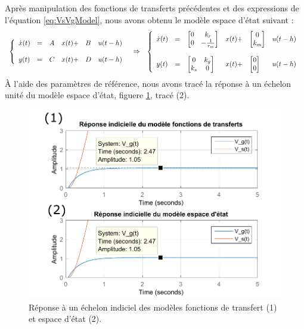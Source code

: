 Après manipulation des fonctions de transferts précédentes et des expressions de l'équation \ref{eq:VsVgModel}, nous avons obtenu le modèle espace d'état suivant : 
\begin{equation}
\label{eq:EE}
\begin{array}{lcl}

\left\lbrace
\begin{array}{l c l c lc}
\dot{x}(t) 
&=& 
A&
x(t) +& 
B &u(t-h)\\
&&&&\\

y(t) 
&=& 
C&
x(t) +& 
D &u(t-h)\\
\end{array}
\right. 

& \Rightarrow &

\left\lbrace
\begin{array}{l c l c lc}
\dot{x}(t) 
&=& 
\begin{bmatrix}
0	&	k_r\\
0	&	-\frac{1}{\tau_m}
\end{bmatrix}&
x(t) +& 
\begin{bmatrix}
0 \\
k_m
\end{bmatrix} &u(t-h)\\
&&&&\\

y(t) 
&=& 
\begin{bmatrix}
0	&	k_g\\
k_s	&	0
\end{bmatrix}&
x(t) +& 
\begin{bmatrix}
0 \\
0
\end{bmatrix} &u(t-h)\\
\end{array}

\right.
\end{array}
\end{equation}
À l'aide des paramètres de référence, nous avons tracé la réponse à un échelon unité du modèle espace d'état, figuere \ref{fig:repIndiFTsEE}, tracé (2).
\begin{figure}[!ht]
\centering
\includegraphics[width=.7\textwidth]{./I/images/modeles_ft-ee.pdf}
\caption{\label{fig:repIndiFTsEE}Réponse à un échelon indiciel des modèles fonctions de transfert (1) et espace d'état (2).}
\end{figure}

